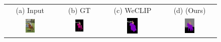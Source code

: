 \begin{figure}[ht]
  \centering
  \setlength{\tabcolsep}{2pt} %
  \renewcommand{\arraystretch}{0.9}
  \begin{tcolorbox}[colframe=black!60, colback=white, boxrule=0.8pt, arc=2pt, left=2pt, right=2pt, top=2pt, bottom=2pt]
    \centering
    \begin{tabular}{cccc}
      (a) Input & (b) GT & (c) WeCLIP & (d) (Ours)           \\
      [1mm]

      \includegraphics[width=0.20\textwidth,height=0.20\textwidth]
      {figures/originals/2007_005331}
                &
      \includegraphics[width=0.20\textwidth,height=0.20\textwidth]
      {figures/colored_gts/2007_005331}
                &
      \includegraphics[width=0.20\textwidth,height=0.20\textwidth]
      {figures/test_labels/weclip/2007_005331_[6, 12, 14]}
                &
      \includegraphics[width=0.20\textwidth,height=0.20\textwidth]
      {figures/test_labels/ours/2007_005331_[6, 12, 14]}    \\


\end{tabular}
\end{tcolorbox}
\end{figure}
